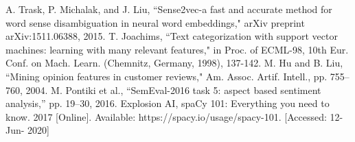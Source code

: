 \documentclass[a4paper,conference]{IEEEtran}
\begin{document}
\begin{thebibliography}{00}
 A. Trask, P. Michalak, and J. Liu, ``Sense2vec-a fast and accurate method for word sense disambiguation in neural word embeddings," arXiv preprint arXiv:1511.06388, 2015.
 T. Joachims, ``Text categorization with support vector machines: learning with many relevant features," in Proc. of ECML-98, 10th Eur. Conf. on Mach. Learn. (Chemnitz, Germany, 1998), 137-142.
 M. Hu and B. Liu, ``Mining opinion features in customer reviews," Am. Assoc. Artif. Intell., pp. 755–760, 2004.
 M. Pontiki et al., “SemEval-2016 task 5: aspect based sentiment analysis,” pp. 19–30, 2016.
 Explosion AI, spaCy 101: Everything you need to know. 2017 [Online]. Available: https://spacy.io/usage/spacy-101. [Accessed: 12- Jun- 2020] 
\end{thebibliography}
\vspace{12pt}
\end{document}
